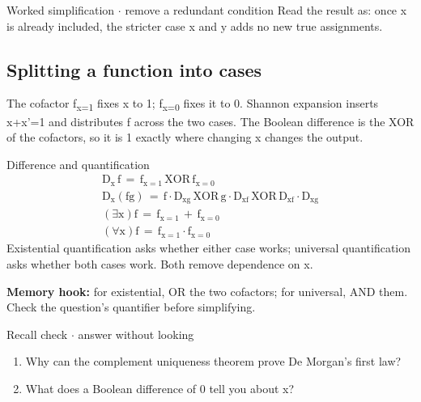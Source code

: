 \documentclass[11pt]{article}
\begin{document}
\begin{keepsection}
\begin{workedbox}{Worked simplification \ensuremath{\cdot} remove a redundant condition}
Read the result as: once x is already included, the stricter case x and y adds no new true assignments.
\end{workedbox}

\begin{keepsection}
\subsection{Splitting a function into cases}

The cofactor f\textsubscript{x=1} fixes x to 1; f\textsubscript{x=0} fixes it to 0. Shannon expansion inserts x+x'=1 and distributes f across the two cases. The Boolean difference is the XOR of the cofactors, so it is 1 exactly where changing x changes the output.

\begin{equationcard}{Difference and quantification}
\[ \begin{gathered} \mathrm{D}_\mathrm{x}\, \mathrm{f}\, =\, \mathrm{f}_{\mathrm{x}=1}\, \text{XOR}\, \mathrm{f}_{\mathrm{x}=0} \\ \mathrm{D}_\mathrm{x}(\text{fg})\, =\, \mathrm{f}\cdot \mathrm{D}_\text{xg}\, \text{XOR}\, \mathrm{g}\cdot \mathrm{D}_\text{xf}\, \text{XOR}\, \mathrm{D}_\text{xf}\cdot \mathrm{D}_\text{xg} \\ (\exists \mathrm{x})\mathrm{f}\, =\, \mathrm{f}_{\mathrm{x}=1}\, +\, \mathrm{f}_{\mathrm{x}=0} \\ (\forall \mathrm{x})\mathrm{f}\, =\, \mathrm{f}_{\mathrm{x}=1}\cdot \mathrm{f}_{\mathrm{x}=0} \end{gathered} \]
{\small Existential quantification asks whether either case works; universal quantification asks whether both cases work. Both remove dependence on x.}
\end{equationcard}

\begin{notebox}\textbf{Memory hook:} for existential, OR the two cofactors; for universal, AND them. Check the question’s quantifier before simplifying.\end{notebox}

\begin{recallbox}{Recall check \ensuremath{\cdot} answer without looking}
\begin{enumerate}
\item Why can the complement uniqueness theorem prove De Morgan’s first law?
\item What does a Boolean difference of 0 tell you about x?
\end{enumerate}

\end{recallbox}
\end{keepsection}
\end{keepsection}
\end{document}
